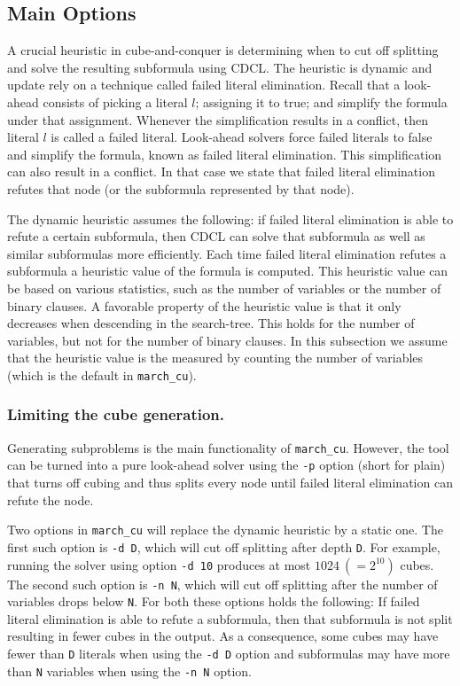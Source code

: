 \documentclass{llncs}
\begin{document}
\subsection{Main Options}
\label{sec:opt:main}

A crucial heuristic in cube-and-conquer is determining when to cut off splitting and solve the resulting subformula using CDCL. 
The heuristic is dynamic and update rely on a technique called failed literal elimination. Recall that a look-ahead consists of
picking a literal $l$; assigning it to true; and simplify the formula under that assignment. Whenever the simplification results in a
conflict, then literal $l$ is called a failed literal. Look-ahead solvers force failed literals to false and simplify the formula, known as
failed literal elimination. This simplification can also result in a conflict. In that case we state that failed literal elimination refutes
that node (or the subformula represented by that node).

The dynamic heuristic assumes the following: if failed literal elimination is able to refute a certain subformula, 
then CDCL can solve that subformula as well as similar subformulas more efficiently. Each time failed literal elimination refutes
a subformula a heuristic value of the formula is computed. This heuristic value can be based on various statistics, such as the
number of variables or the number of binary clauses. A favorable property of the heuristic value is that it only decreases when 
descending in the search-tree. This holds for the number of variables,  but not for the number of binary clauses. In this subsection
we assume that the heuristic value is the measured by counting the number of variables (which is the default in {\tt march\_cu}).

\subsubsection{Limiting the cube generation.}

Generating subproblems is the main functionality of {\tt march\_cu}. However, the tool can be turned into a pure look-ahead
solver using the {\tt -p} option (short for plain) that turns off cubing and thus splits every node until failed literal elimination can refute the node.

Two options in {\tt march\_cu} will replace the dynamic heuristic by a static one. The first such option is {\tt -d D}, which will 
cut off splitting after depth {\tt D}. For example, running the solver using option {\tt -d 10} produces at most $1024~(= 2^{10})$
cubes. The second such option is {\tt -n N}, which will cut off splitting after the number of variables drops below {\tt N}.
For both these options holds the following: If failed literal elimination is able to refute a subformula, then that subformula is not
split resulting in fewer cubes in the output. As a consequence, some cubes may have fewer than {\tt D} literals when using the
{\tt -d D} option and subformulas may have more than {\tt N} variables when using the  {\tt -n N} option.
\end{document}
